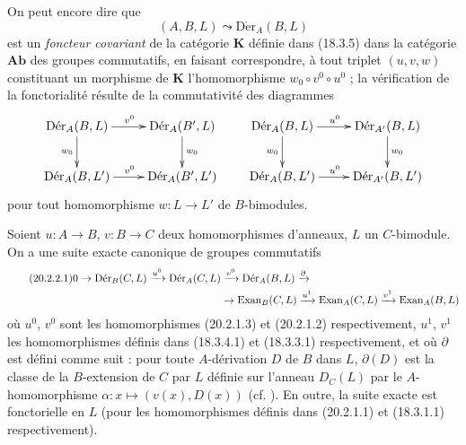 \begin{env}[20.2.1]
On peut encore dire que
\[
  (A,B,L)\leadsto\operatorname{D\acute{e}r}_A(B,L)
\]
est un \emph{foncteur covariant} de la catégorie $\boldsymbol{K}$ définie dans
(18.3.5) dans la catégorie $\boldsymbol{Ab}$ des groupes commutatifs, en
faisant correspondre, à tout triplet $(u,v,w)$ constituant un morphisme de
$\boldsymbol{K}$ l'homomorphisme $w_0\circ v^0\circ u^0$ ; la vérification de
la fonctorialité résulte de la commutativité des diagrammes
\[
\xymatrix{
  \operatorname{D\acute{e}r}_A(B,L) \ar[r]^{v^0} \ar[d]_{w_0} &
    \operatorname{D\acute{e}r}_A(B',L) \ar[d]^{w_0} \\
  \operatorname{D\acute{e}r}_A(B,L') \ar[r]^{v^0} &
    \operatorname{D\acute{e}r}_A(B',L')
}
\qquad
\xymatrix{
  \operatorname{D\acute{e}r}_A(B,L) \ar[r]^{u^0} \ar[d]_{w_0} &
    \operatorname{D\acute{e}r}_{A'}(B,L) \ar[d]^{w_0} \\
  \operatorname{D\acute{e}r}_A(B,L') \ar[r]^{u^0} &
    \operatorname{D\acute{e}r}_{A'}(B,L')
}
\]
pour tout homomorphisme $w:L\to L'$ de $B$-bimodules.
\end{env}

\begin{theorem}[20.2.2]
\label{0.20.2.2-fr}
Soient $u:A\to B$, $v:B\to C$ deux homomorphismes d'anneaux, $L$ un
$C$-bimodule. On a une suite exacte canonique de groupes commutatifs
\begin{align}
\tag{20.2.2.1}
\label{0.20.2.2.1-fr}
  0\to\operatorname{D\acute{e}r}_B(C,L)\xrightarrow{u^0}
  \operatorname{D\acute{e}r}_A(C,L)&\xrightarrow{v^0}
  \operatorname{D\acute{e}r}_A(B,L)\xrightarrow{\partial} \\
  &\to\operatorname{Exan}_B(C,L)\xrightarrow{u^1}
  \operatorname{Exan}_A(C,L)\xrightarrow{v^1}
  \operatorname{Exan}_A(B,L) \notag
\end{align}
où $u^0$, $v^0$ sont les homomorphismes (20.2.1.3) et (20.2.1.2)
respectivement, $u^1$, $v^1$ les homomorphismes définis dans (18.3.4.1) et
(18.3.3.1) respectivement, et où $\partial$ est défini comme suit : pour
toute $A$-dérivation $D$ de $B$ dans $L$, $\partial(D)$ est la classe de la
$B$-extension de $C$ par $L$ définie sur l'anneau $D_C(L)$ par le
$A$-homomorphisme $\alpha:x\mapsto(v(x),D(x))$ (cf.
). En outre, la suite exacte  est
fonctorielle en $L$ (pour les homomorphismes définis dans (20.2.1.1) et
(18.3.1.1) respectivement).
\end{theorem}

